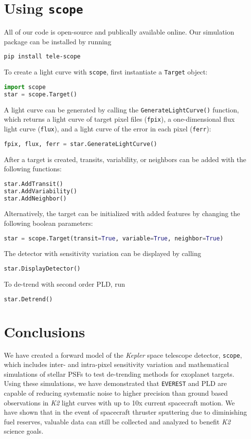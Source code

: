 \documentclass[12pt,preprint]{aastex}
\begin{document}
\section{Using \texttt{scope}}

All of our code is open-source and publically available online. Our simulation package can be installed by running
%
\begin{lstlisting}[language=bash]
pip install tele-scope
\end{lstlisting}
%
To create a light curve with \texttt{scope}, first instantiate a \texttt{Target} object:
%
\begin{lstlisting}[language=Python]
import scope
star = scope.Target()
\end{lstlisting}
%
A light curve can be generated by calling the \texttt{GenerateLightCurve()} function, which returns a light curve of target pixel files (\texttt{fpix}), a one-dimensional flux light curve (\texttt{flux}), and a light curve of the error in each pixel (\texttt{ferr}):
%
\begin{lstlisting}[language=Python]
fpix, flux, ferr = star.GenerateLightCurve()
\end{lstlisting}
%
After a target is created, transits, variability, or neighbors can be added with the following functions:
%
\begin{lstlisting}[language=Python]
star.AddTransit()
star.AddVariability()
star.AddNeighbor()
\end{lstlisting}
Alternatively, the target can be initialized with added features by changing the following boolean parameters:
%
\begin{lstlisting}[language=Python]
star = scope.Target(transit=True, variable=True, neighbor=True)
\end{lstlisting}
%
The detector with sensitivity variation can be displayed by calling
%
\begin{lstlisting}[language=Python]
star.DisplayDetector()
\end{lstlisting}
%
To de-trend with second order PLD, run
\begin{lstlisting}[language=Python]
star.Detrend()
\end{lstlisting}
\section{Conclusions}

We have created a forward model of the \textit{Kepler} space telescope detector, \texttt{scope}, which includes inter- and intra-pixel sensitivity variation and mathematical simulations of stellar PSFs to test de-trending methods for exoplanet targets. Using these simulations, we have demonstrated that \texttt{EVEREST} and PLD are  capable of reducing systematic noise to higher precision than ground based observations in \textit{K2} light curves with up to 10x current spacecraft motion. We have shown that in the event of spacecraft thruster sputtering due to diminishing fuel reserves, valuable data can still be collected and analyzed to benefit \textit{K2} science goals.
\end{document}
